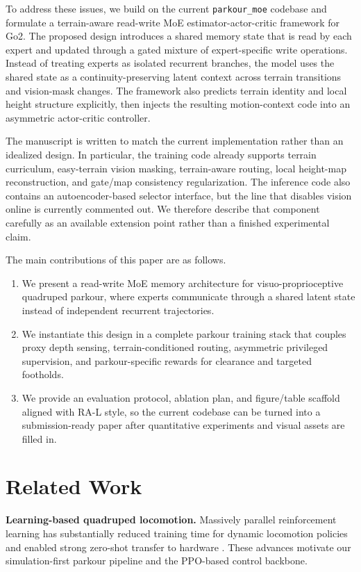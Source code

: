 \documentclass[letterpaper,10pt,conference]{ieeeconf}
\begin{document}
To address these issues, we build on the current \texttt{parkour\_moe} codebase and formulate a terrain-aware read-write MoE estimator-actor-critic framework for Go2. The proposed design introduces a shared memory state that is read by each expert and updated through a gated mixture of expert-specific write operations. Instead of treating experts as isolated recurrent branches, the model uses the shared state as a continuity-preserving latent context across terrain transitions and vision-mask changes. The framework also predicts terrain identity and local height structure explicitly, then injects the resulting motion-context code into an asymmetric actor-critic controller.

The manuscript is written to match the current implementation rather than an idealized design. In particular, the training code already supports terrain curriculum, easy-terrain vision masking, terrain-aware routing, local height-map reconstruction, and gate/map consistency regularization. The inference code also contains an autoencoder-based selector interface, but the line that disables vision online is currently commented out. We therefore describe that component carefully as an available extension point rather than a finished experimental claim.

The main contributions of this paper are as follows.
\begin{enumerate}
    \item We present a read-write MoE memory architecture for visuo-proprioceptive quadruped parkour, where experts communicate through a shared latent state instead of independent recurrent trajectories.
    \item We instantiate this design in a complete parkour training stack that couples proxy depth sensing, terrain-conditioned routing, asymmetric privileged supervision, and parkour-specific rewards for clearance and targeted footholds.
    \item We provide an evaluation protocol, ablation plan, and figure/table scaffold aligned with RA-L style, so the current codebase can be turned into a submission-ready paper after quantitative experiments and visual assets are filled in.
\end{enumerate}

\section{Related Work}
\textbf{Learning-based quadruped locomotion.}
Massively parallel reinforcement learning has substantially reduced training time for dynamic locomotion policies and enabled strong zero-shot transfer to hardware \cite{rudin2022learning,hwangbo2019learning}. These advances motivate our simulation-first parkour pipeline and the PPO-based control backbone.
\end{document}
